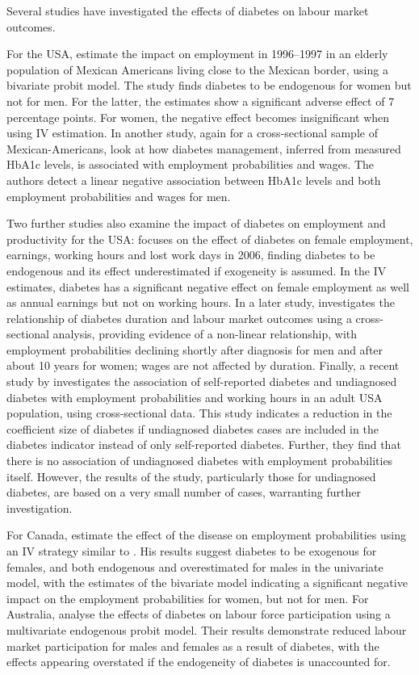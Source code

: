 Several studies have investigated the effects of diabetes on labour market outcomes. 

For the USA, \textcite{Brown2005} estimate  the impact on employment in 1996--1997 in an elderly population of Mexican Americans living close to the Mexican border, using a bivariate probit model. The study finds diabetes to be endogenous for women but not for men.  For the latter, the estimates show a significant adverse effect of 7 percentage points. For women, the negative effect becomes insignificant when using \ac{IV} estimation. In another study, again for a cross-sectional sample of  Mexican-Americans, \textcite{BrownIII2011} look at how diabetes management, inferred from measured \ac{HbA1c} levels, is associated with employment probabilities and wages. The authors detect a linear negative association between \ac{HbA1c} levels and both employment probabilities and wages for men. 

Two further studies also examine the impact of diabetes on employment and productivity for the USA: \textcite{Minor2011} focuses on the effect of diabetes on female employment, earnings, working hours and lost work days in 2006, finding diabetes to be endogenous and its effect underestimated if exogeneity is assumed. In the \ac{IV} estimates, diabetes has a significant negative effect on female employment as well as annual earnings but not on working hours. In a later study, \textcite{Minor2013} investigates the relationship of diabetes duration and labour market outcomes using a cross-sectional analysis, providing evidence of a non-linear relationship, with employment probabilities declining shortly after diagnosis for men and after about 10 years for women; wages are not affected by duration. Finally, a recent study by \textcite{Minor2015} investigates the association of self-reported diabetes and undiagnosed diabetes with employment probabilities and working hours in an adult USA population, using cross-sectional data. This study indicates a reduction in the coefficient size of diabetes if undiagnosed diabetes cases are included in the diabetes indicator instead of only self-reported diabetes. Further, they find that there is no association of undiagnosed diabetes with employment probabilities itself. However, the results of the study, particularly those for undiagnosed diabetes, are based on a very small number of cases, warranting further investigation.

For Canada, \textcite{Latif2009} estimate the effect of the disease on employment probabilities using an \ac{IV} strategy similar to \textcite{Brown2005}. His results suggest diabetes to be exogenous for females, and both endogenous and overestimated for males in the univariate model, with the estimates of the bivariate model indicating a significant negative impact on the employment probabilities for women, but not for men. For Australia, \textcite{Zhang2009} analyse the effects of diabetes on labour force participation using a multivariate endogenous probit model. Their results demonstrate reduced labour market participation for males and females as a result of diabetes, with the effects appearing overstated if the endogeneity of diabetes is unaccounted for. 

